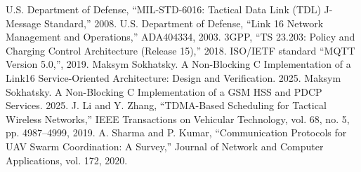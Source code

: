 \documentclass{article}
\begin{document}
\begin{thebibliography}{10}
 U.S. Department of Defense, ``MIL-STD-6016: Tactical Data Link (TDL) J-Message Standard,'' 2008.
 U.S. Department of Defense, ``Link 16 Network Management and Operations,'' ADA404334, 2003.
 3GPP, ``TS 23.203: Policy and Charging Control Architecture (Release 15),'' 2018.
 ISO/IETF standard ``MQTT Version 5.0,'', 2019.
 Maksym Sokhatsky. A Non-Blocking C Implementation of a Link16 Service-Oriented Architecture: Design and Verification. 2025.
 Maksym Sokhatsky. A Non-Blocking C Implementation of a GSM HSS and PDCP Services. 2025.
 J. Li and Y. Zhang, ``TDMA-Based Scheduling for Tactical Wireless Networks,'' IEEE Transactions on Vehicular Technology, vol. 68, no. 5, pp. 4987--4999, 2019.
 A. Sharma and P. Kumar, ``Communication Protocols for UAV Swarm Coordination: A Survey,'' Journal of Network and Computer Applications, vol. 172, 2020.
\end{thebibliography}
\end{document}
